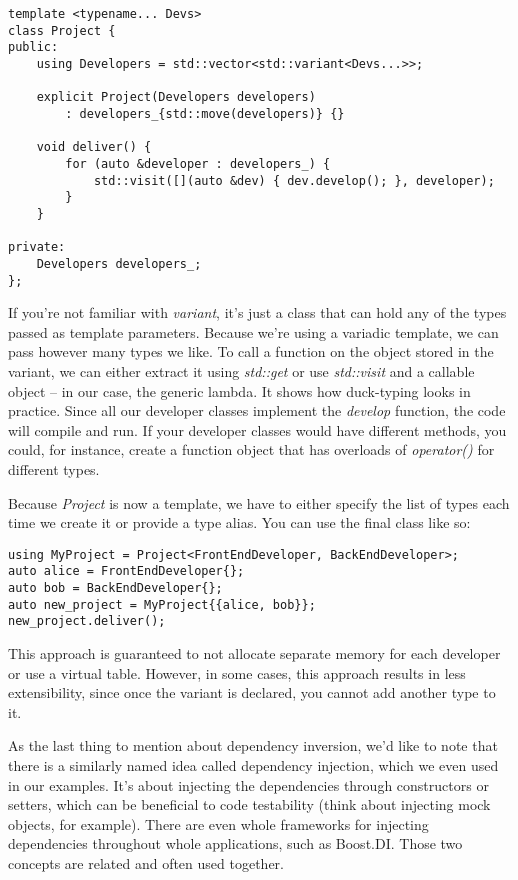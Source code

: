 \begin{lstlisting}[style=styleCXX]
template <typename... Devs>
class Project {
public:
	using Developers = std::vector<std::variant<Devs...>>;
	
	explicit Project(Developers developers)
		: developers_{std::move(developers)} {}
	
	void deliver() {
		for (auto &developer : developers_) {
			std::visit([](auto &dev) { dev.develop(); }, developer);
		}
	}

private:
	Developers developers_;
};

\end{lstlisting}

If you're not familiar with \textit{variant}, it's just a class that can hold any of the types passed as template parameters. Because we're using a variadic template, we can pass however many types we like. To call a function on the object stored in the variant, we can either extract it using \textit{std::get} or use \textit{std::visit} and a callable object – in our case, the generic lambda. It shows how duck-typing looks in practice. Since all our developer classes implement the \textit{develop} function, the code will compile and run. If your developer classes would have different methods, you could, for instance, create a function object that has overloads of \textit{operator()} for different types.

Because \textit{Project} is now a template, we have to either specify the list of types each time we create it or provide a type alias. You can use the final class like so:


\begin{lstlisting}[style=styleCXX]
using MyProject = Project<FrontEndDeveloper, BackEndDeveloper>;
auto alice = FrontEndDeveloper{};
auto bob = BackEndDeveloper{};
auto new_project = MyProject{{alice, bob}};
new_project.deliver();

\end{lstlisting}

This approach is guaranteed to not allocate separate memory for each developer or use a virtual table. However, in some cases, this approach results in less extensibility, since once the variant is declared, you cannot add another type to it.

As the last thing to mention about dependency inversion, we'd like to note that there is a similarly named idea called dependency injection, which we even used in our examples. It's about injecting the dependencies through constructors or setters, which can be beneficial to code testability (think about injecting mock objects, for example). There are even whole frameworks for injecting dependencies throughout whole applications, such as Boost.DI. Those two concepts are related and often used together.

